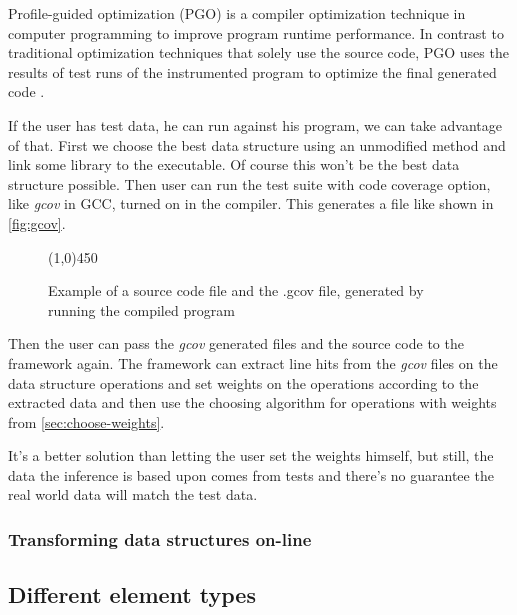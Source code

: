 \documentclass[a4paper,11pt]{article}
\begin{document}
			Profile-guided optimization (PGO) is a compiler optimization technique in computer programming
			to improve program runtime performance.  In contrast to traditional optimization techniques that
			solely use the source code, PGO uses the results of test runs of the instrumented program to
			optimize the final generated code .

			If the user has test data, he can run against his program, we can take advantage of that.  First
			we choose the best data structure using an unmodified method and link some library to the
			executable. Of course this won't be the best data structure possible. Then user can run the test
			suite with code coverage option, like \emph{gcov} in GCC, turned on in the compiler. This
			generates a file like shown in \autoref{fig:gcov}.

			\begin{figure} \label{fig:gcov}
				

				\centering \line(1,0){450}

				

				\caption{Example of a source code file and the .gcov file, generated by running the
				compiled program}

				\label{fig:gcov}
			\end{figure}


			Then the user can pass the \emph{gcov} generated files and the source code to the framework
			again. The framework can extract line hits from the \emph{gcov} files on the data structure
			operations and set weights on the operations according to the extracted data and then use the
			choosing algorithm for operations with weights from \autoref{sec:choose-weights}.

			It's a better solution than letting the user set the weights himself, but still, the data the
			inference is based upon comes from tests and there's no guarantee the real world data will
			match the test data.

		\subsubsection{Transforming data structures on-line} \label{sec:transforming-on-line}


	\subsection{Different element types}
\end{document}
